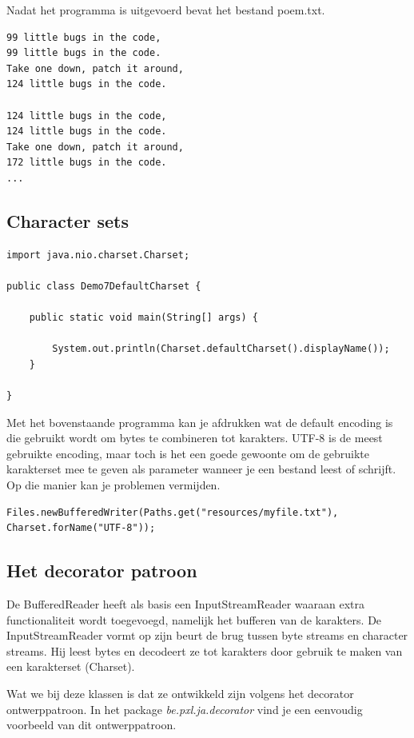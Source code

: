 \documentclass{tstextbook}
\begin{document}
Nadat het programma is uitgevoerd bevat het bestand poem.txt.

\begin{verbatim}
99 little bugs in the code,
99 little bugs in the code.
Take one down, patch it around,
124 little bugs in the code.

124 little bugs in the code,
124 little bugs in the code.
Take one down, patch it around,
172 little bugs in the code.
...
\end{verbatim}

\subsection{Character sets}

\begin{lstlisting}
import java.nio.charset.Charset;

public class Demo7DefaultCharset {

	public static void main(String[] args) {

		System.out.println(Charset.defaultCharset().displayName());
	}

}
\end{lstlisting}

Met het bovenstaande programma kan je afdrukken wat de default encoding is die gebruikt wordt om bytes te combineren tot karakters. UTF-8 is de meest gebruikte encoding, maar toch is het een goede gewoonte om de gebruikte karakterset mee te geven als parameter wanneer je een bestand leest of schrijft. Op die manier kan je problemen vermijden.

\begin{lstlisting}
Files.newBufferedWriter(Paths.get("resources/myfile.txt"), Charset.forName("UTF-8"));
\end{lstlisting}

\subsection{Het decorator patroon}

De BufferedReader heeft als basis een InputStreamReader waaraan extra functionaliteit wordt toegevoegd, namelijk het bufferen van de karakters. De InputStreamReader vormt op zijn beurt de brug tussen byte streams en character streams. Hij leest bytes en decodeert ze tot karakters door gebruik te maken van een karakterset (Charset).

Wat we bij deze klassen is dat ze ontwikkeld zijn volgens het decorator ontwerppatroon.
In het package \textit{be.pxl.ja.decorator} vind je een eenvoudig voorbeeld van dit ontwerppatroon.
\end{document}
